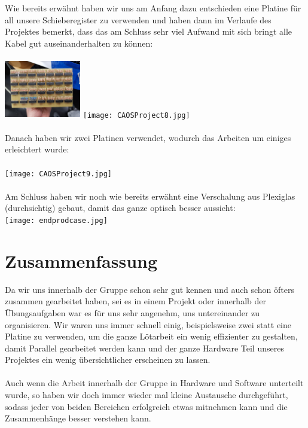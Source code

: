 \documentclass[12pt,a4paper]{article}
\begin{document}
Wie bereits erwähnt haben wir uns am Anfang dazu entschieden eine Platine für all unsere Schieberegister zu verwenden 
und haben dann im Verlaufe des Projektes bemerkt, dass das am Schluss sehr viel Aufwand mit sich bringt alle Kabel gut
auseinanderhalten zu können: \\\\
\includegraphics[width=0.25\textwidth]{CAOSProject7.jpg}
\texttt{[image: CAOSProject8.jpg]} \\\\

Danach haben wir zwei Platinen verwendet, wodurch das Arbeiten um einiges erleichtert wurde: \\\\
\texttt{[image: CAOSProject9.jpg]} \\\\

Am Schluss haben wir noch wie bereits erwähnt eine Verschalung aus Plexiglas (durchsichtig) gebaut, 
damit das ganze optisch besser aussieht: \\
\texttt{[image: endprodcase.jpg]}


\section{Zusammenfassung}

Da wir uns innerhalb der Gruppe schon sehr gut kennen und auch schon öfters zusammen gearbeitet haben, sei es in einem Projekt oder  innerhalb der Übungsaufgaben war es für uns sehr angenehm, uns untereinander zu organisieren. Wir waren uns immer schnell einig, beispielsweise zwei statt eine Platine zu verwenden, um die ganze Lötarbeit ein wenig effizienter zu gestalten, damit Parallel gearbeitet werden kann und der ganze Hardware Teil unseres Projektes ein wenig übersichtlicher erscheinen zu lassen. \\\\
Auch wenn die Arbeit innerhalb der Gruppe in Hardware und Software unterteilt wurde, so haben wir doch immer wieder mal kleine Austausche durchgeführt, sodass jeder von beiden Bereichen erfolgreich etwas mitnehmen kann und die Zusammenhänge besser verstehen kann.\\
\end{document}
